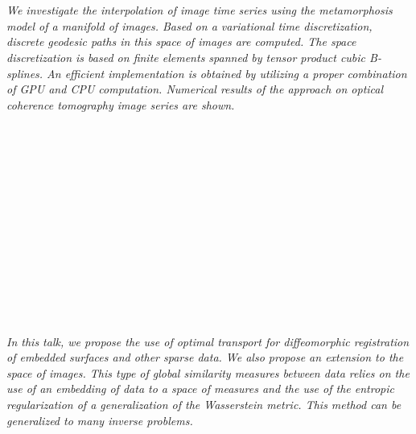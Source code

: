 \begin{multicols}{2}
        \\
        \\\\
        \\
        \\\\
\\
      \textit{We investigate the interpolation of image time series using the metamorphosis model of a manifold of images. Based on a variational time discretization, discrete geodesic paths in this space of images are computed. The space discretization is based on finite elements spanned by tensor product cubic B-splines. An efficient implementation is obtained by utilizing a proper combination of GPU and CPU computation. Numerical results of the approach on optical coherence tomography image series are shown.}\\
\\ 
        \\
        \\\\
        \\
        \\\\
        \\
        \\\\
        \\
        \\\\
\\
      \textit{In this talk, we propose the use of optimal transport for diffeomorphic registration of embedded surfaces and other sparse data. We also propose an extension to the space of images. This type of global similarity measures between data relies on the use of an embedding of data to a space of measures and the use of the entropic regularization of a generalization of the Wasserstein metric. This method can be generalized to many inverse problems.}\\
\\ 
        \\
        \\\\

\end{multicols}
